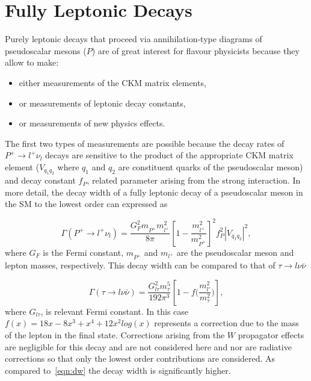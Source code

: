 \section{Fully Leptonic  Decays}
\label{lnudecays}
Purely leptonic decays that proceed via annihilation-type diagrams of pseudoscalar mesons ($P$) are of great interest for flavour physicists because they allow to make:
\begin{itemize}
\item either measurements of the \gls{CKM} matrix elements,
\item or measurements of leptonic decay constants,
\item or measurements of new physics effects.
\end{itemize}
The first two types of measurements are possible because the decay rates of $P^{+}\rightarrow l^{+} \nu_{l}$ decays are sensitive to the product of the appropriate \gls{CKM} matrix element ($V_{q_{1}q_{2}}$ where $q_{1}$ and $q_{2}$ are constituent quarks of the pseudoscalar meson) and decay constant $f_{P}$, related parameter arising from the strong interaction. In more detail, the decay width of a fully leptonic decay of a pseudoscalar meson in the \gls{SM} to the lowest order can expressed as 

\begin{equation}
\Gamma(P^{+} \rightarrow {l^{+}} \nu_{l})=  
	\frac{G_{F}^{2} m^{}_{P^{+}}  m_{l^{+}}^{2}}{8\pi} 
	\left[1 - \frac{m_{l^{+}}^{2}}{m_{P^{+}}^{2}}\right]^{2}  
	f_{P}^{2} |V_{q_{1}q_{2}}|^{2} 
	,
\label{eqn:dw} 
\end{equation}
where
$G_F$ is the Fermi constant,
$m^{}_{P^{+}}$ and $m_{l^{+}}$ are the pseudoscalar meson and lepton masses, respectively. This decay width can be compared to that of $\tau \rightarrow l\nu \bar{\nu}$\cite{Marciano:1988vm}


\begin{equation}
\Gamma(\tau \rightarrow {l} \nu \bar{\nu})=
	\frac{G^{2}_{l\tau} m^{5}_{\tau}}{192\pi^{3}}\left[1-f\big(\frac{m^{2}_{l'}}{{m^{2}_{\tau}}}\big)\right],
\label{eqn:tauonic} 
\end{equation}
where $G_{l\tau}$, is relevant Fermi constant. In this case $ f(x) = 1  8x - 8x^{3} + x^{4} + 12x^{2}log(x)$ represents a correction due to the mass of the lepton
in the final state. Corrections arising from the $W$ propagator effects are negligible for this decay and are not considered here and nor are radiative corrections so that only the lowest order contributions are considered. As compared to~\autoref{eqn:dw} the decay width is significantly higher. 

